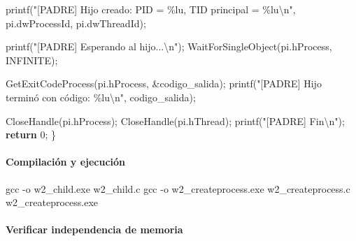 \documentclass[
  spanish,
]{article}
\newenvironment{Shaded}{}{}
\newcommand{\AttributeTok}[1]{\textcolor[rgb]{0.49,0.56,0.16}{#1}}
\newcommand{\ControlFlowTok}[1]{\textcolor[rgb]{0.00,0.44,0.13}{\textbf{#1}}}
\newcommand{\DecValTok}[1]{\textcolor[rgb]{0.25,0.63,0.44}{#1}}
\newcommand{\NormalTok}[1]{#1}
\newcommand{\OperatorTok}[1]{\textcolor[rgb]{0.40,0.40,0.40}{#1}}
\newcommand{\SpecialCharTok}[1]{\textcolor[rgb]{0.25,0.44,0.63}{#1}}
\newcommand{\StringTok}[1]{\textcolor[rgb]{0.25,0.44,0.63}{#1}}
\begin{document}
\begin{Shaded}
\begin{Highlighting}[]
\NormalTok{    printf}\OperatorTok{(}\StringTok{"[PADRE] Hijo creado: PID = }\SpecialCharTok{\%lu}\StringTok{, TID principal = }\SpecialCharTok{\%lu\textbackslash{}n}\StringTok{"}\OperatorTok{,}
\NormalTok{           pi}\OperatorTok{.}\NormalTok{dwProcessId}\OperatorTok{,}\NormalTok{ pi}\OperatorTok{.}\NormalTok{dwThreadId}\OperatorTok{);}

\NormalTok{    printf}\OperatorTok{(}\StringTok{"[PADRE] Esperando al hijo...}\SpecialCharTok{\textbackslash{}n}\StringTok{"}\OperatorTok{);}
\NormalTok{    WaitForSingleObject}\OperatorTok{(}\NormalTok{pi}\OperatorTok{.}\NormalTok{hProcess}\OperatorTok{,}\NormalTok{ INFINITE}\OperatorTok{);}

\NormalTok{    GetExitCodeProcess}\OperatorTok{(}\NormalTok{pi}\OperatorTok{.}\NormalTok{hProcess}\OperatorTok{,} \OperatorTok{\&}\NormalTok{codigo\_salida}\OperatorTok{);}
\NormalTok{    printf}\OperatorTok{(}\StringTok{"[PADRE] Hijo terminó con código: }\SpecialCharTok{\%lu\textbackslash{}n}\StringTok{"}\OperatorTok{,}\NormalTok{ codigo\_salida}\OperatorTok{);}

\NormalTok{    CloseHandle}\OperatorTok{(}\NormalTok{pi}\OperatorTok{.}\NormalTok{hProcess}\OperatorTok{);}
\NormalTok{    CloseHandle}\OperatorTok{(}\NormalTok{pi}\OperatorTok{.}\NormalTok{hThread}\OperatorTok{);}
\NormalTok{    printf}\OperatorTok{(}\StringTok{"[PADRE] Fin}\SpecialCharTok{\textbackslash{}n}\StringTok{"}\OperatorTok{);}
    \ControlFlowTok{return} \DecValTok{0}\OperatorTok{;}
\OperatorTok{\}}
\end{Highlighting}
\end{Shaded}

\paragraph{Compilación y
ejecución}\label{compilaciuxf3n-y-ejecuciuxf3n-1}

\begin{Shaded}
\begin{Highlighting}[]
\NormalTok{gcc }\AttributeTok{{-}o}\NormalTok{ w2\_child.exe w2\_child.c}
\NormalTok{gcc }\AttributeTok{{-}o}\NormalTok{ w2\_createprocess.exe w2\_createprocess.c}
\NormalTok{w2\_createprocess.exe}
\end{Highlighting}
\end{Shaded}

\paragraph{Verificar independencia de
memoria}\label{verificar-independencia-de-memoria}
\end{document}
